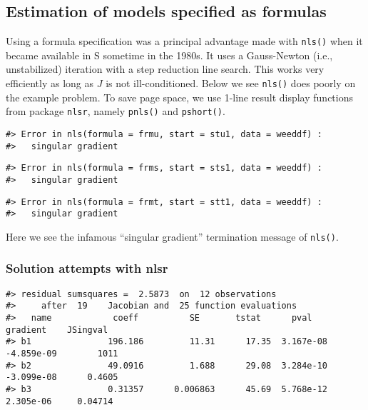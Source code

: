 \hypertarget{estimation-of-models-specified-as-formulas}{%
\subsection{Estimation of models specified as formulas}\label{estimation-of-models-specified-as-formulas}}

Using a formula specification was a principal advantage made
with \texttt{nls()} when it became available in S sometime in the 1980s. It uses a
Gauss-Newton (i.e., unstabilized) iteration with a step reduction line
search. This works very efficiently as long as \(J\) is not ill-conditioned.
Below we see \texttt{nls()} does poorly on the example problem. To save page space,
we use 1-line result display functions from package \texttt{nlsr}, namely \texttt{pnls()}
and \texttt{pshort()}.

\begin{verbatim}
#> Error in nls(formula = frmu, start = stu1, data = weeddf) : 
#>   singular gradient
\end{verbatim}

\begin{verbatim}
#> Error in nls(formula = frms, start = sts1, data = weeddf) : 
#>   singular gradient
\end{verbatim}

\begin{verbatim}
#> Error in nls(formula = frmt, start = stt1, data = weeddf) : 
#>   singular gradient
\end{verbatim}

Here we see the infamous ``singular gradient'' termination message of \texttt{nls()}.

\hypertarget{solution-attempts-with-nlsr}{%
\subsubsection{Solution attempts with nlsr}\label{solution-attempts-with-nlsr}}

\begin{verbatim}
#> residual sumsquares =  2.5873  on  12 observations
#>     after  19    Jacobian and  25 function evaluations
#>   name            coeff          SE       tstat      pval      gradient    JSingval   
#> b1               196.186         11.31      17.35  3.167e-08  -4.859e-09        1011  
#> b2               49.0916         1.688      29.08  3.284e-10  -3.099e-08      0.4605  
#> b3               0.31357      0.006863      45.69  5.768e-12   2.305e-06     0.04714
\end{verbatim}

